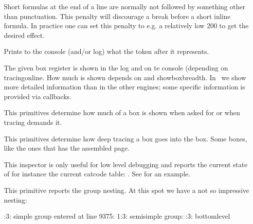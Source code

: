 \stopnewprimitive

\startnewprimitive[title={\prm {shortinlineorphanpenalty}}]

Short formulas at the end of a line are normally not followed by something other
than punctuation. This penalty will discourage a break before a short inline
formula. In practice one can set this penalty to e.g. a relatively low 200 to get
the desired effect.

\stopnewprimitive

\startoldprimitive[title={\prm {show}}]

Prints to the console (and/or log) what the token after
it represents.

\stopoldprimitive

\startoldprimitive[title={\prm {showbox}}]

The given box register is shown in the log and on te console (depending on \prm
{tracingonline}. How much is shown depends on  and \prm
{showboxbreadth}. In \LUAMETATEX\ we show more detailed information than in the
other engines; some specific information is provided via callbacks.

\stopoldprimitive

\startoldprimitive[title={\prm {showboxbreadth}}]

This primitives determine how much of a box is shown when asked for or when
tracing demands it.

\stopoldprimitive

\startoldprimitive[title={\prm {showboxdepth}}]

This primitives determine how deep tracing a box goes into the box. Some boxes,
like the ones that has the assembled page.

\stopoldprimitive

\startnewprimitive[title={\prm {showcodestack}}]

This inspector is only useful for low level debugging and reports the current
state of for instance the current catcode table: \typ {\showcodestack \catcode}.
See  for an example.

\stopnewprimitive

\startoldprimitive[title={\prm {showgroups}}]

This primitive reports the group nesting. At this spot we have a not so
impressive nesting:

:3: simple group entered at line 9375:
1:3: semisimple group: :3: bottomlevel
\stoptyping

